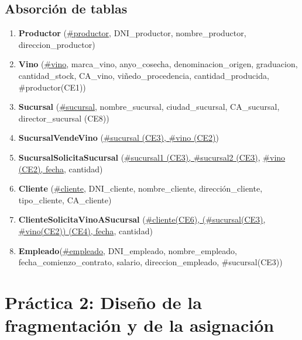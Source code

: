\documentclass[paper=a4, fontsize=12pt]{article} %
\numberwithin{equation}{section} %
\numberwithin{figure}{section} %
\numberwithin{table}{section} %
\begin{document}
\subsection {Absorción de tablas}

\begin{enumerate}
\item \textbf{Productor} (\underline{\#productor}, DNI\_productor, nombre\_productor, direccion\_productor)
\item \textbf{Vino} (\underline{\#vino}, marca\_vino, anyo\_cosecha, denominacion\_origen, graduacion,  cantidad\_stock, CA\_vino, viñedo\_procedencia, cantidad\_producida, \#productor(CE1))
\item \textbf{Sucursal} (\underline{\#sucursal}, nombre\_sucursal, ciudad\_sucursal, CA\_sucursal, director\_sucursal (CE8))
\item \textbf{SucursalVendeVino} (\underline{\#sucursal (CE3), \#vino (CE2)})
\item \textbf{SucursalSolicitaSucursal} (\underline{\#sucursal1 (CE3), \#sucursal2 (CE3)}, \underline{\#vino (CE2), fecha}, cantidad)
\item \textbf{Cliente} (\underline{\#cliente}, DNI\_cliente, nombre\_cliente, dirección\_cliente, tipo\_cliente, CA\_cliente)
\item \textbf{ClienteSolicitaVinoASucursal} (\underline{\#cliente(CE6), (\#sucursal(CE3)}, \underline{\#vino(CE2)) (CE4), fecha}, cantidad)
\item \textbf{Empleado}(\underline{\#empleado}, DNI\_empleado, nombre\_empleado, fecha\_comienzo\_contrato, salario, direccion\_empleado, \#sucursal(CE3))
\end{enumerate}

\section {Práctica 2: Diseño de la fragmentación y de la asignación}
\end{document}

